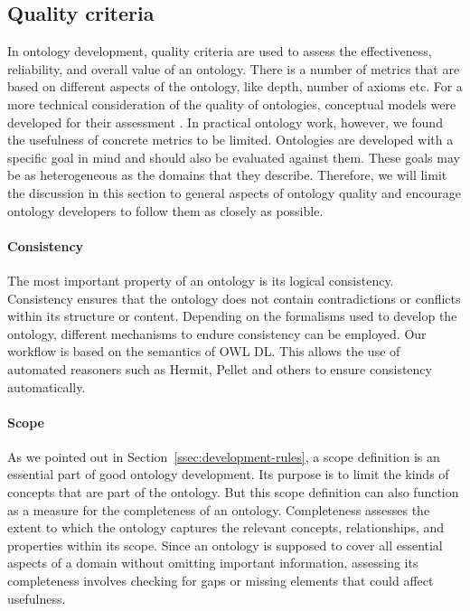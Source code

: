 \subsection{Quality criteria}


In ontology development, quality criteria are used to assess the effectiveness, reliability, and overall value of an ontology. There is a number of metrics that are based on different aspects of the ontology, like depth, number of axioms etc. For a more technical consideration of the quality of ontologies, conceptual models were developed for their assessment \cite{WilsonQuality2021, WilsonQuality2023}. In practical ontology work, however, we found the usefulness of concrete metrics to be limited. Ontologies are developed with a specific goal in mind and should also be evaluated against them. These goals may be as heterogeneous as the domains that they describe. Therefore, we will limit the discussion in this section to general aspects of ontology quality and encourage ontology developers to follow them as closely as possible. %

\paragraph{Consistency}

The most important property of an ontology is its logical consistency. Consistency ensures that the ontology does not contain contradictions or conflicts within its structure or content. Depending on the formalisms used to develop the ontology, different mechanisms to endure consistency can be employed. Our workflow is based on the semantics of OWL DL. This allows the use of automated reasoners such as Hermit, Pellet and others to ensure consistency automatically.

\paragraph{Scope}

As we pointed out in Section~\ref{ssec:development-rules}, a scope definition is an essential part of good ontology development. Its purpose is to limit the kinds of concepts that are part of the ontology. But this scope definition can also function as a measure for the completeness of an ontology. Completeness assesses the extent to which the ontology captures the relevant concepts, relationships, and properties within its scope. Since an ontology is supposed to cover all essential aspects of a domain without omitting important information, assessing its completeness involves checking for gaps or missing elements that could affect usefulness.

